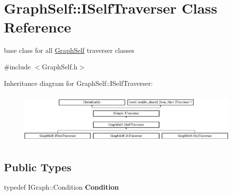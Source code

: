 \hypertarget{class_graph_self_1_1_i_self_traverser}{}\section{Graph\+Self\+:\+:I\+Self\+Traverser Class Reference}
\label{class_graph_self_1_1_i_self_traverser}


base class for all \hyperlink{class_graph_self}{Graph\+Self} traverser classes  




{\ttfamily \#include $<$Graph\+Self.\+h$>$}

Inheritance diagram for Graph\+Self\+:\+:I\+Self\+Traverser\+:\begin{figure}[H]
\begin{center}
\leavevmode
\includegraphics[height=2.657177cm]{class_graph_self_1_1_i_self_traverser}
\end{center}
\end{figure}
\subsection*{Public Types}
\begin{DoxyCompactItemize}
\item 
\mbox{\label{class_graph_self_1_1_i_self_traverser_adeff9e8b95bf333821a6071f8cedfaac}} 
typedef I\+Graph\+::\+Condition {\bfseries Condition}
\end{DoxyCompactItemize}
